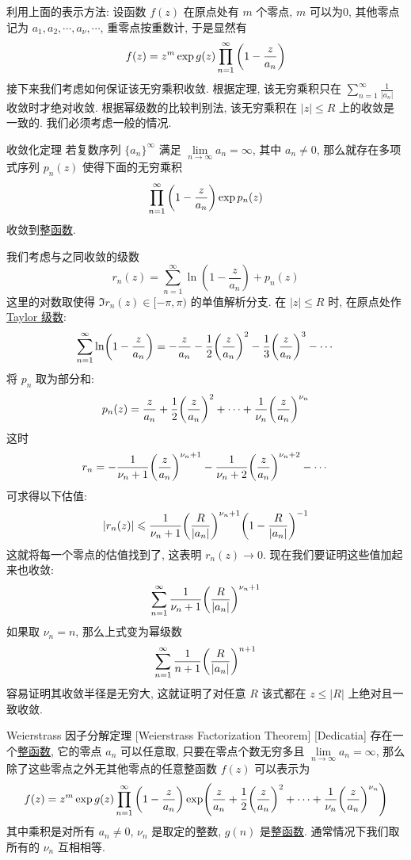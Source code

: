         利用上面的表示方法: 设函数 \(f(z)\) 在原点处有 \(m\) 个零点,  \(m\) 可以为0, 其他零点记为 \(a_1,a_2,\cdots, a_\nu, \cdots\), 重零点按重数计, 于是显然有
        \[f(z)=z^m\exp g(z)\prod_{n=1}^{\infty}\qty(1-\frac{z}{a_n})\]
        接下来我们考虑如何保证该无穷乘积收敛. 根据定理, 该无穷乘积只在 \(\sum\limits_{n=1}^{\infty}\frac{1}{|a_n|}\) 收敛时才绝对收敛. 根据幂级数的比较判别法, 该无穷乘积在 \(|z|\leqslant R\) 上的收敛是一致的. 我们必须考虑一般的情况. 

        \begin{thm}
            {收敛化定理}
            若复数序列 \(\{a_n\}^\infty\) 满足 \(\lim\limits_{n\to\infty}a_n=\infty\), 其中 \(a_n\neq 0\), 那么就存在多项式序列 \(p_n(z)\) 使得下面的无穷乘积
            \[\prod_{n=1}^{\infty}\qty(1-\frac{z}{a_n})\exp p_n(z)\]
            收敛到\hyperref[dfn:Entire-Function]{整函数}.
        \end{thm}

        \begin{prf}
            我们考虑与之同收敛的级数
            \[r_n(z)=\sum_{n=1}^{\infty}\ln(1-\frac{z}{a_n})+p_n(z)\]
            这里的对数取使得 \(\Im r_n(z)\in[-\pi,\pi)\) 的单值解析分支. 在 \(|z|\leqslant R\) 时, 在原点处作\hyperref[thm:Taylor]{Taylor 级数}:
            \[\sum_{n=1}^{\infty}\ln(1-\frac{z}{a_n})=-\frac{z}{a_n}-\frac{1}{2}\qty(\frac{z}{a_n})^2-\frac{1}{3}\qty(\frac{z}{a_n})^3-\cdots\]
            将 \(p_n\) 取为部分和: 
            \[p_n(z)=\frac{z}{a_n}+\frac{1}{2}\qty(\frac{z}{a_n})^2+\cdots+\frac{1}{\nu_n}\qty(\frac{z}{a_n})^{\nu_n}\]
            这时
            \[r_n=-\frac{1}{\nu_n+1}\qty(\frac{z}{a_n})^{\nu_n+1}-\frac{1}{\nu_n+2}\qty(\frac{z}{a_n})^{\nu_n+2}-\cdots\]
            可求得以下估值: 
            \[|r_n(z)|\leqslant\frac{1}{\nu_n+1}\qty(\frac{R}{|a_n|})^{\nu_n+1}\qty(1-\frac{R}{|a_n|})^{-1} \]
            这就将每一个零点的估值找到了, 这表明 \(r_n(z)\to 0\). 现在我们要证明这些值加起来也收敛: 
            \[\sum_{n=1}^{\infty}\frac{1}{\nu_n+1}\qty(\frac{R}{|a_n|})^{\nu_n+1}\]
            如果取 \(\nu_n=n\), 那么上式变为幂级数
            \[\sum_{n=1}^{\infty}\frac{1}{n+1}\qty(\frac{R}{|a_n|})^{n+1}\]
            容易证明其收敛半径是无穷大, 这就证明了对任意 \(R\) 该式都在 \(z\leq|R|\) 上绝对且一致收敛. 
        \end{prf}

        \begin{thm}
            {Weierstrass 因子分解定理}
            [Weierstrass Factorization Theorem]
            [Dedicatia]
            存在一个\hyperref[dfn:Entire-Function]{整函数}, 它的零点 \(a_n\) 可以任意取, 只要在零点个数无穷多且 \(\lim\limits_{n\to\infty }a_n=\infty\), 那么除了这些零点之外无其他零点的任意整函数 \(f(z)\) 可以表示为
            \[f(z)=z^m\exp g(z)\prod_{n=1}^{\infty}\qty(1-\frac{z}{a_n})\exp(\frac{z}{a_n}+\frac{1}{2}\qty(\frac{z}{a_n})^2+\cdots+\frac{1}{\nu_n}\qty(\frac{z}{a_n})^{\nu_n})\]
            其中乘积是对所有 \(a_n\neq 0\),  \(\nu_n\) 是取定的整数,  \(g(n)\) 是\hyperref[dfn:Entire-Function]{整函数}. 通常情况下我们取所有的 \(\nu_n\) 互相相等. 
        \end{thm}

